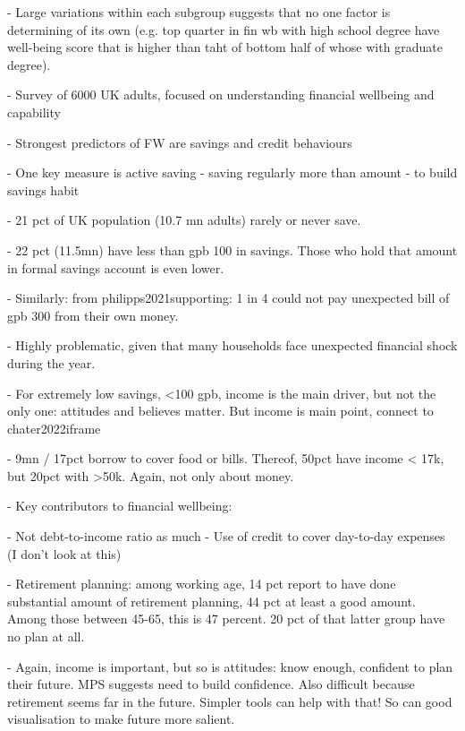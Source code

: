 - Large variations within each subgroup suggests that no one factor is
determining of its own (e.g. top quarter in fin wb with high school degree have
well-being score that is higher than taht of bottom half of whose with graduate
degree).



\citet{mps2018building}
- Survey of 6000 UK adults, focused on understanding financial wellbeing and
capability

- Strongest predictors of FW are savings and credit behaviours

- One key measure is active saving - saving regularly more than amount - to
build savings habit

- 21 pct of UK population (10.7 mn adults) rarely or never save.

- 22 pct (11.5mn) have less than gpb 100 in savings. Those who hold that amount
in formal savings account is even lower.

- Similarly: from philipps2021supporting: 1 in 4 could not pay unexpected bill
of gpb 300 from their own money.

- Highly problematic, given that many households face unexpected financial
shock during the year.

- For extremely low savings, <100 gpb, income is the main driver, but not the
only one: attitudes and believes matter. But income is main point, connect to
chater2022iframe

- 9mn / 17pct borrow to cover food or bills. Thereof, 50pct have income < 17k,
but 20pct with >50k. Again, not only about money.

- Key contributors to financial wellbeing:

    - Not debt-to-income ratio as much
    - Use of credit to cover day-to-day expenses (I don't look at this)

- Retirement planning: among working age, 14 pct report to have done
substantial amount of retirement planning, 44 pct at least a good amount. Among
those between 45-65, this is 47 percent. 20 pct of that latter group have no
plan at all. 

- Again, income is important, but so is attitudes: know enough, confident to
plan their future. MPS suggests need to build confidence. Also difficult
because retirement seems far in the future.  Simpler tools can
help with that! So can good visualisation to make future more salient. 





